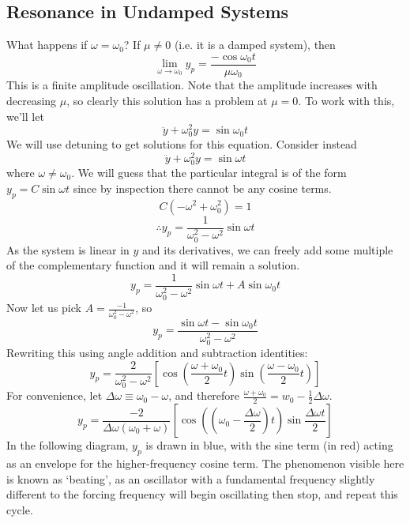 \documentclass{article}
\begin{document}
\subsection{Resonance in Undamped Systems}
What happens if $\omega = \omega_0$? If $\mu \neq 0$ (i.e. it is a damped system), then
\[ \lim_{\omega \to \omega_0} y_p = \frac{-\cos\omega_0 t}{\mu\omega_0} \]
This is a finite amplitude oscillation. Note that the amplitude increases with decreasing $\mu$, so clearly this solution has a problem at $\mu = 0$. To work with this, we'll let
\[ \ddot y + \omega_0^2 y = \sin\omega_0 t \]
We will use detuning to get solutions for this equation. Consider instead
\[ \ddot y + \omega_0^2 y = \sin\omega t \]
where $\omega \neq \omega_0$. We will guess that the particular integral is of the form $y_p = C\sin\omega t$ since by inspection there cannot be any cosine terms.
\[ C(-\omega^2 + \omega_0^2) = 1 \]
\[ \therefore y_p = \frac{1}{\omega_0^2 - \omega^2}\sin\omega t \]
As the system is linear in $y$ and its derivatives, we can freely add some multiple of the complementary function and it will remain a solution.
\[ y_p = \frac{1}{\omega_0^2 - \omega^2}\sin\omega t + A \sin\omega_0 t \]
Now let us pick $A = \frac{-1}{\omega_0^2 - \omega^2}$, so
\[ y_p = \frac{\sin \omega t - \sin \omega_0 t}{\omega_0^2 - \omega^2} \]
Rewriting this using angle addition and subtraction identities:
\[ y_p = \frac{2}{\omega_0^2 - \omega^2}\left[ \cos\left( \frac{\omega + \omega_0}{2}t \right) \sin\left( \frac{\omega - \omega_0}{2}t \right) \right] \]
For convenience, let $\Delta\omega \equiv \omega_0 - \omega$, and therefore $\frac{\omega + \omega_0}{2} = w_0 - \frac{1}{2}\Delta\omega$.
\[ y_p = \frac{-2}{\Delta\omega(\omega_0 + \omega)}\left[ \cos\left( \left(\omega_0 - \frac{\Delta\omega}{2}\right)t \right) \sin\frac{\Delta\omega t}{2} \right] \]
In the following diagram, $y_p$ is drawn in blue, with the sine term (in red) acting as an envelope for the higher-frequency cosine term. The phenomenon visible here is known as `beating', as an oscillator with a fundamental frequency slightly different to the forcing frequency will begin oscillating then stop, and repeat this cycle.\medskip

\end{document}

